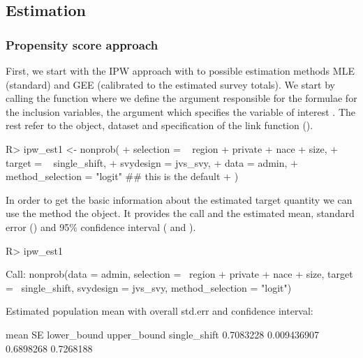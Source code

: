 \documentclass[
]{jss}
\begin{document}
\subsection{Estimation}\label{estimation}

\subsubsection{Propensity score
approach}\label{propensity-score-approach}

First, we start with the IPW approach with to possible estimation
methods MLE (standard) and GEE (calibrated to the estimated survey
totals). We start by calling the  function where we define
the  argument responsible for the formulae for the
inclusion variables, the  argument which specifies the
variable of interest . The rest refer to the
 object, dataset and specification of the link function
().

\begin{CodeChunk}
\begin{CodeInput}
R> ipw_est1 <- nonprob(
+   selection = ~ region + private + nace + size,
+   target = ~ single_shift,
+   svydesign = jvs_svy,
+   data = admin,
+   method_selection = "logit" ## this is the default
+ )
\end{CodeInput}
\end{CodeChunk}

In order to get the basic information about the estimated target
quantity we can use the  method the object. It provides the
call and the estimated mean, standard error () and 95\%
confidence interval ( and ).

\begin{CodeChunk}
\begin{CodeInput}
R> ipw_est1
\end{CodeInput}
\begin{CodeOutput}

Call:
nonprob(data = admin, selection = ~region + private + nace + 
    size, target = ~single_shift, svydesign = jvs_svy, method_selection = "logit")

Estimated population mean with overall std.err and confidence interval:

                  mean          SE lower_bound upper_bound
single_shift 0.7083228 0.009436907   0.6898268   0.7268188
\end{CodeOutput}
\end{CodeChunk}
\end{document}
